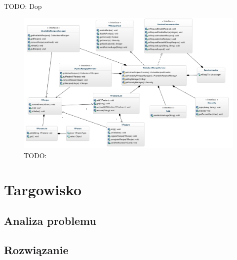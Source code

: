 \documentclass[11pt,a4paper,polish,thesis]{dcsbook}
\begin{document}
TODO: Dop
\begin{figure}[p]
  \centering
  \includegraphics[scale=0.55]{./resources/service_uml.png}
  \caption{TODO:}
  \label{fig:service_uml}
\end{figure}
\section{Targowisko}            %
\subsection{Analiza problemu}

\subsection{Rozwiązanie}
\end{document}
